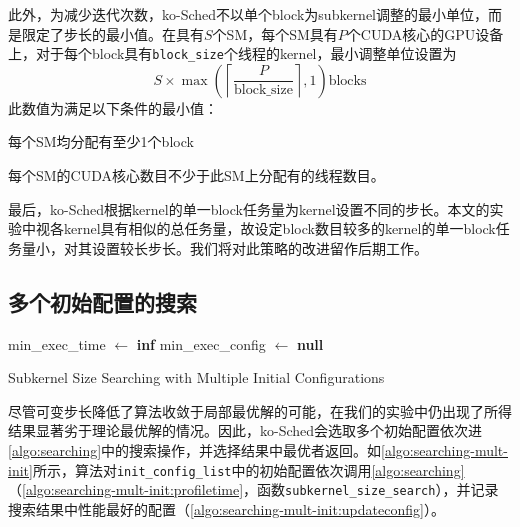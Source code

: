 此外，为减少迭代次数，ko-Sched不以单个block为subkernel调整的最小单位，而是限定了步长的最小值。在具有$S$个SM，每个SM具有$P$个CUDA核心的GPU设备上，对于每个block具有\texttt{block\_size}个线程的kernel，最小调整单位设置为
\begin{equation}
    S \times \max \left(\left\lceil \frac{P}{\text{block\_size}}\right\rceil  , 1\right) \text{blocks} \label{eq:searching:stepsize}
\end{equation}
此数值为满足以下条件的最小值：
\begin{enumerate*}[label=\roman*),itemjoin={\quad}]
    \item 每个SM均分配有至少1个block
    \item 每个SM的CUDA核心数目不少于此SM上分配有的线程数目。
\end{enumerate*}

最后，ko-Sched根据kernel的单一block任务量为kernel设置不同的步长。本文的实验中视各kernel具有相似的总任务量，故设定block数目较多的kernel的单一block任务量小，对其设置较长步长。我们将对此策略的改进留作后期工作。

\subsection{多个初始配置的搜索}

\begin{algorithm}[htbp]
    \SetAlgoLined
    min\_exec\_time $\gets$ \textbf{inf}\; \label{algo:searching-mult-init:initmin}
    min\_exec\_config $\gets$ \textbf{null}\; \label{algo:searching-mult-init:initminconfig}
    \;
    \caption{Subkernel Size Searching with Multiple Initial Configurations}
    \label{algo:searching-mult-init}
\end{algorithm}

尽管可变步长降低了算法收敛于局部最优解的可能，在我们的实验中仍出现了所得结果显著劣于理论最优解的情况。因此，ko-Sched会选取多个初始配置依次进\autoref{algo:searching}中的搜索操作，并选择结果中最优者返回。如\autoref{algo:searching-mult-init}所示，算法对\texttt{init\_config\_list}中的初始配置依次调用\autoref{algo:searching}（\autoref{algo:searching-mult-init:profiletime}，函数\texttt{subkernel\_size\_search}），并记录搜索结果中性能最好的配置（\autoref{algo:searching-mult-init:updateconfig}）。

